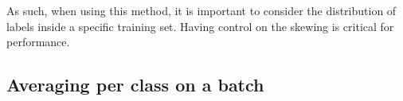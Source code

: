 \documentclass[english]{article}
\begin{document}
As such, when using this method, it is important to consider the distribution of labels inside a specific training set. Having control on the skewing is critical for performance.









\subsection{Averaging per class on a batch }














    
\end{document}
